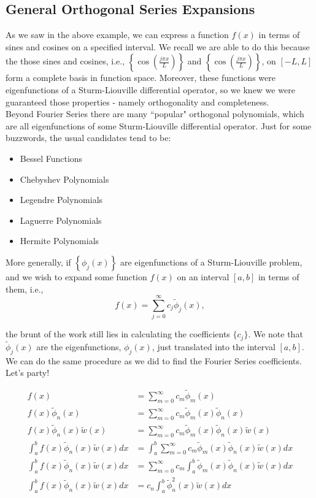 %
%
%
%

\subsection{General Orthogonal Series Expansions}

As we saw in the above example, we can express a function $f(x)$ in terms of sines and cosines on a specified interval. We recall we are able to do this because the those sines and cosines, i.e., $\left\{ \cos\left( \frac{j\pi x}{L} \right ) \right\}$ and $\left\{ \cos\left( \frac{j\pi x}{L} \right ) \right\}$, on $[-L,L]$ form a complete basis in function space. Moreover, these functions were eigenfunctions of a Sturm-Liouville differential operator, so we knew we were guaranteed those properties - namely orthogonality and completeness. \\

Beyond Fourier Series there are many ``popular" orthogonal polynomials, which are all eigenfunctions of some Sturm-Liouville differential operator. Just for some buzzwords, the usual candidates tend to be:

\begin{itemize}
\item Bessel Functions
\item Chebyshev Polynomials
\item Legendre Polynomials
\item Laguerre Polynomials
\item Hermite Polynomials
\end{itemize}

More generally, if $\left\{ \phi_j(x) \right\}$ are eigenfunctions of a Sturm-Liouville problem, and we wish to expand some function $f(x)$ on an interval $[a,b]$ in terms of them, i.e., 
$$f(x) = \sum_{j=0}^{\infty} c_j \tilde{\phi}_j(x),$$

the brunt of the work still lies in calculating the coefficients $\{ c_j\}$. We note that $\tilde{\phi}_j(x)$ are the eigenfunctions, $\phi_j(x)$, just translated into the interval $[a,b].$ We can do the same procedure as we did to find the Fourier Series coefficients. Let's party!

\begin{align*}
f(x) &= \sum_{m=0}^{\infty} c_m \tilde{\phi}_m(x) \\
 f(x) \tilde{\phi}_n(x)  &=\sum_{m=0}^{\infty} c_m \tilde{\phi}_m(x) \tilde{\phi}_n(x)  \\
  f(x) \tilde{\phi}_n(x) \tilde{w}(x)  &=\sum_{m=0}^{\infty} c_m \tilde{\phi}_m(x) \tilde{\phi}_n(x) \tilde{w}(x) \\
\int_{a}^{b} f(x) \tilde{\phi}_n(x) \tilde{w}(x) dx &= \int_a^b \sum_{m=0}^{\infty} c_m \tilde{\phi}_m(x) \tilde{\phi}_n(x) \tilde{w}(x) dx \\
\int_{a}^{b} f(x) \tilde{\phi}_n(x) \tilde{w}(x) dx &= \sum_{m=0}^{\infty} c_m  \int_a^b  \tilde{\phi}_m(x) \tilde{\phi}_n(x)  \tilde{w}(x) dx \\
\int_{a}^{b} f(x) \tilde{\phi}_n(x) \tilde{w}(x) dx &=  c_n \int_a^b  \tilde{\phi}^2_n(x) \tilde{w}(x) dx \\
\end{align*}

